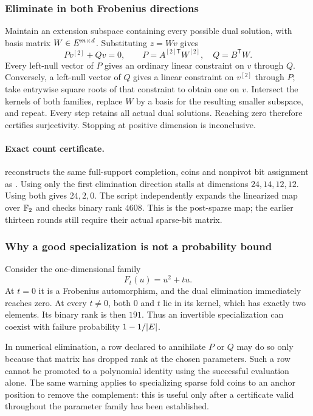 \subsubsection{Eliminate in both Frobenius directions}

Maintain an extension subspace containing every possible dual solution, with basis matrix $W\in E^{m\times d}$. Substituting $z=Wv$ gives
\[
 Pv^{[2]}+Qv=0,\qquad
 P=A^{[2]\mathsf T}W^{[2]},\quad Q=B^{\mathsf T}W.
\]
Every left-null vector of $P$ gives an ordinary linear constraint on $v$ through $Q$. Conversely, a left-null vector of $Q$ gives a linear constraint on $v^{[2]}$ through $P$; take entrywise square roots of that constraint to obtain one on $v$. Intersect the kernels of both families, replace $W$ by a basis for the resulting smaller subspace, and repeat. Every step retains all actual dual solutions. Reaching zero therefore certifies surjectivity. Stopping at positive dimension is inconclusive.

\paragraph{Exact count certificate.}  reconstructs the same full-support completion, coins and nonpivot bit assignment as . Using only the first elimination direction stalls at dimensions $24,14,12,12$. Using both gives $24,2,0$. The script independently expands the linearized map over $\mathbb{F}_2$ and checks binary rank $4608$. This is the post-sparse map; the earlier thirteen rounds still require their actual sparse-bit matrix.

\subsubsection{Why a good specialization is not a probability bound}

Consider the one-dimensional family
\[
 F_t(u)=u^2+tu.
\]
At $t=0$ it is a Frobenius automorphism, and the dual elimination immediately reaches zero. At every $t\ne0$, both $0$ and $t$ lie in its kernel, which has exactly two elements. Its binary rank is then $191$. Thus an invertible specialization can coexist with failure probability $1-1/|E|$.

In numerical elimination, a row declared to annihilate $P$ or $Q$ may do so only because that matrix has dropped rank at the chosen parameters. Such a row cannot be promoted to a polynomial identity using the successful evaluation alone. The same warning applies to specializing sparse fold coins to an anchor position to remove the complement: this is useful only after a certificate valid throughout the parameter family has been established.

